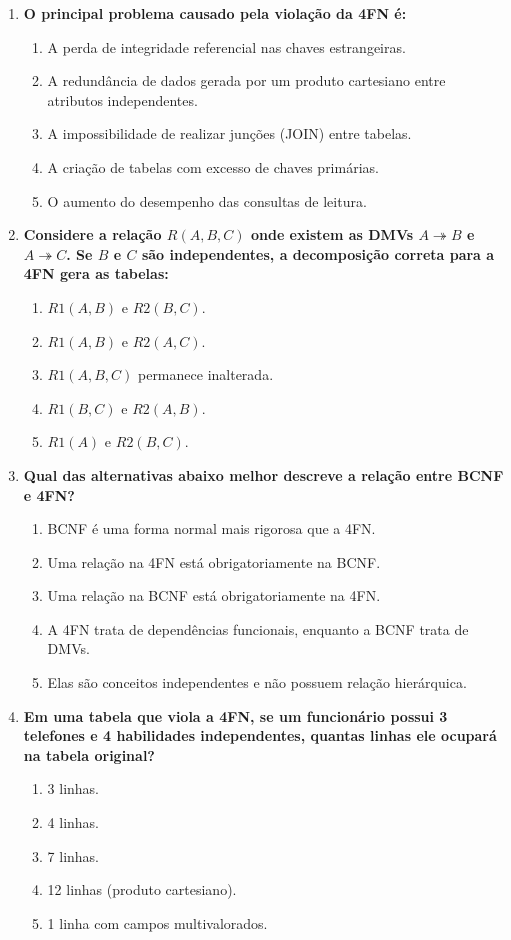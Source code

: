 \documentclass[12pt]{article}
\begin{document}
\begin{enumerate}[label=\textbf{Questão \arabic*:}, leftmargin=*]
  \item \textbf{O principal problema causado pela violação da 4FN é:}
  \begin{enumerate}[label=\alph*)]
    \item A perda de integridade referencial nas chaves estrangeiras.
    \item A redundância de dados gerada por um produto cartesiano entre atributos independentes.
    \item A impossibilidade de realizar junções (JOIN) entre tabelas.
    \item A criação de tabelas com excesso de chaves primárias.
    \item O aumento do desempenho das consultas de leitura.
  \end{enumerate}

  \item \textbf{Considere a relação $R(A, B, C)$ onde existem as DMVs $A \twoheadrightarrow B$ e $A \twoheadrightarrow C$. Se $B$ e $C$ são independentes, a decomposição correta para a 4FN gera as tabelas:}
  \begin{enumerate}[label=\alph*)]
    \item $R1(A, B)$ e $R2(B, C)$.
    \item $R1(A, B)$ e $R2(A, C)$.
    \item $R1(A, B, C)$ permanece inalterada.
    \item $R1(B, C)$ e $R2(A, B)$.
    \item $R1(A)$ e $R2(B, C)$.
  \end{enumerate}

  \item \textbf{Qual das alternativas abaixo melhor descreve a relação entre BCNF e 4FN?}
  \begin{enumerate}[label=\alph*)]
    \item BCNF é uma forma normal mais rigorosa que a 4FN.
    \item Uma relação na 4FN está obrigatoriamente na BCNF.
    \item Uma relação na BCNF está obrigatoriamente na 4FN.
    \item A 4FN trata de dependências funcionais, enquanto a BCNF trata de DMVs.
    \item Elas são conceitos independentes e não possuem relação hierárquica.
  \end{enumerate}

  \item \textbf{Em uma tabela que viola a 4FN, se um funcionário possui 3 telefones e 4 habilidades independentes, quantas linhas ele ocupará na tabela original?}
  \begin{enumerate}[label=\alph*)]
    \item 3 linhas.
    \item 4 linhas.
    \item 7 linhas.
    \item 12 linhas (produto cartesiano).
    \item 1 linha com campos multivalorados.
  \end{enumerate}




\end{enumerate}
\end{document}
